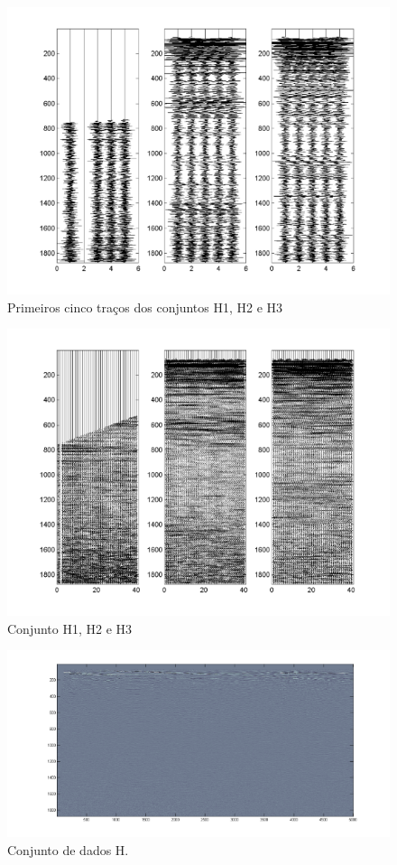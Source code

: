 \begin{figure}[!h]
\centering
  \includegraphics[scale=1.01]{fig/fig_H1.png}
  \caption{Primeiros cinco traços dos conjuntos H1, H2 e H3}
  \label{Figura:h1h2h3}
\end{figure}

\begin{figure}[!h]
\centering
\includegraphics[scale=1.01]{fig/fig_H2.png}
\caption{Conjunto H1, H2 e H3}
\label{Figura:h1h2h3comp}
\end{figure}

\begin{figure}[!h]
\centering
\includegraphics[scale=1]{fig/over_img_h.png}
\caption{Conjunto de dados H.}
\label{Figura:conjuntodedadosh}
\end{figure}

